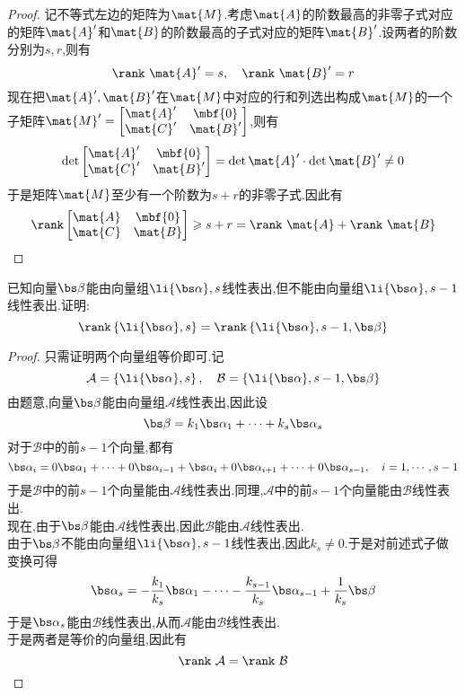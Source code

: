 \documentclass{ctexart}
\begin{document}
\begin{proof}
    记不等式左边的矩阵为$\mat{M}$.考虑$\mat{A}$的阶数最高的非零子式对应的矩阵$\mat{A}'$和$\mat{B}$的阶数最高的子式对应的矩阵$\mat{B}'$.设两者的阶数分别为$s,r$,则有
    \[\rank\ \mat{A}'=s,\quad\rank\ \mat{B}'=r\]
    现在把$\mat{A}',\mat{B}'$在$\mat{M}$中对应的行和列选出构成$\mat{M}$的一个子矩阵$\mat{M}'=\begin{bmatrix}
        \mat{A}'&\mbf{0}\\
        \mat{C}'&\mat{B}'
    \end{bmatrix}$,则有
    \[\det\begin{bmatrix}
        \mat{A}'&\mbf{0}\\
        \mat{C}'&\mat{B}'
    \end{bmatrix}=\det\mat{A}'\cdot\det\mat{B}'\neq0\]
    于是矩阵$\mat{M}$至少有一个阶数为$s+r$的非零子式.因此有
    \[\rank\begin{bmatrix}
        \mat{A}&\mbf{0}\\
        \mat{C}&\mat{B}
    \end{bmatrix}\geqslant s+r=\rank\ \mat{A}+\rank\ \mat{B}\]
\end{proof}
\begin{homework}[6]
    已知向量$\bs\beta$能由向量组$\li{\bs\alpha},s$线性表出,但不能由向量组$\li{\bs\alpha},{s-1}$线性表出.证明:
    \[\rank\left\{\li{\bs\alpha},s\right\}=\rank\left\{\li{\bs\alpha},{s-1},\bs\beta\right\}\]
\end{homework}
\begin{proof}
    只需证明两个向量组等价即可.记
    \[\mathcal{A}=\left\{\li{\bs\alpha},s\right\},\quad\mathcal{B}=\left\{\li{\bs\alpha},{s-1},\bs\beta\right\}\]
    由题意,向量$\bs\beta$能由向量组$\mathcal{A}$线性表出,因此设
    \[\bs\beta=k_1\bs\alpha_1+\cdots+k_s\bs\alpha_s\]
    对于$\mathcal{B}$中的前$s-1$个向量,都有
    \[\bs\alpha_i=0\bs\alpha_1+\cdots+0\bs\alpha_{i-1}+\bs\alpha_i+0\bs\alpha_{i+1}+\cdots+0\bs\alpha_{s-1},\quad i=1,\cdots,s-1\]
    于是$\mathcal{B}$中的前$s-1$个向量能由$\mathcal{A}$线性表出.同理,$\mathcal{A}$中的前$s-1$个向量能由$\mathcal{B}$线性表出.\\
    现在,由于$\bs\beta$能由$\mathcal{A}$线性表出,因此$\mathcal{B}$能由$\mathcal{A}$线性表出.\\
    由于$\bs\beta$不能由向量组$\li{\bs\alpha},{s-1}$线性表出,因此$k_s\neq0$.于是对前述式子做变换可得
    \[\bs\alpha_s=-\dfrac{k_1}{k_s}\bs\alpha_1-\cdots-\dfrac{k_{s-1}}{k_s}\bs\alpha_{s-1}+\dfrac{1}{k_s}\bs\beta\]
    于是$\bs\alpha_s$能由$\mathcal{B}$线性表出,从而$\mathcal{A}$能由$\mathcal{B}$线性表出.\\
    于是两者是等价的向量组,因此有
    \[\rank\ \mathcal{A}=\rank\ \mathcal{B}\]
\end{proof}
\end{document}
